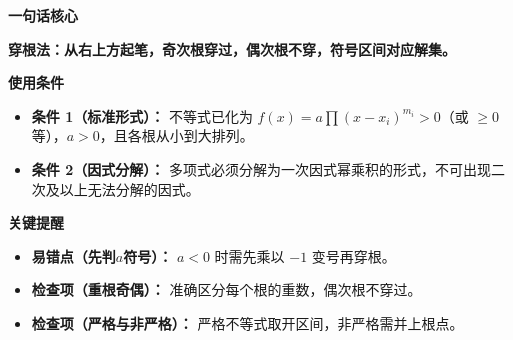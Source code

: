 \begin{summarybox}
	\textbf{\textcolor{CSummary}{一句话核心}}

	\textbf{穿根法：从右上方起笔，奇次根穿过，偶次根不穿，符号区间对应解集。}

	\medskip
	\textbf{\textcolor{CSummary}{使用条件}}
	\begin{itemize}[leftmargin=*, itemsep=0.5em, topsep=0.4em]
		\item \textbf{条件 1（标准形式）：} 不等式已化为 $f(x)=a\prod (x-x_i)^{m_i}>0$（或 $\ge0$ 等），$a>0$，且各根从小到大排列。
		\item \textbf{条件 2（因式分解）：} 多项式必须分解为一次因式幂乘积的形式，不可出现二次及以上无法分解的因式。
	\end{itemize}

	\medskip
	\textbf{\textcolor{CSummary}{关键提醒}}
	\begin{itemize}[leftmargin=*, itemsep=0.5em, topsep=0.4em]
		\item \textbf{易错点（先判$a$符号）：} $a<0$ 时需先乘以 $-1$ 变号再穿根。
		\item \textbf{检查项（重根奇偶）：} 准确区分每个根的重数，偶次根不穿过。
		\item \textbf{检查项（严格与非严格）：} 严格不等式取开区间，非严格需并上根点。
	\end{itemize}
\end{summarybox}
